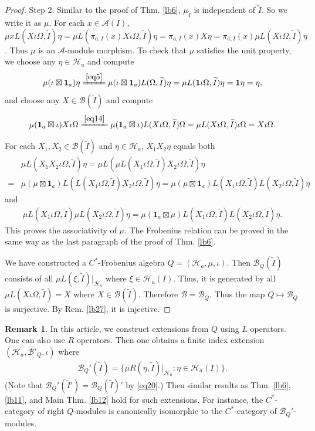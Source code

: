 \documentclass[11pt,b5paper,notitlepage]{article}
\theoremstyle{definition}
\newtheorem{rem}[df]{Remark}
\theoremstyle{plain}
\newcommand{\mc}{\mathcal}
\newcommand{\wtd}{\widetilde}
\newcommand{\id}{\mathbf{1}}
\numberwithin{equation}{section}
\begin{document}
\begin{proof}
Step 2. Similar to the proof of Thm. \ref{lb6}, $\mu_{\wtd I}$ is independent of $\wtd I$. So we write it as $\mu$. For each $x\in\mc A(I)$, $\mu xL(X\iota\Omega,\wtd I)\eta=\mu L(\pi_{a,I}(x) X\iota\Omega,\wtd I)\eta=\pi_{a,I}(x) X\eta=\pi_{a,I}(x)\mu L(X\iota\Omega,\wtd I)\eta$. Thus $\mu$ is an $\mc A$-module morphism. To check that $\mu$ satisfies the unit property, we choose any $\eta\in\mc H_a$ and compute
\begin{align*}
\mu(\iota\boxtimes\id_a)\eta\xlongequal{\eqref{eq5}}\mu(\iota\boxtimes\id_a)L(\Omega,\wtd I)\eta=\mu L(\id \iota\Omega,\wtd I)\eta=\id\eta=\eta,	
\end{align*}
and choose any $X\in\mc B(\wtd I)$ and compute
\begin{align*}
\mu (\id_a\boxtimes\iota)X\iota\Omega\xlongequal{\eqref{eq14}}\mu (\id_a\boxtimes\iota)L(X\iota\Omega,\wtd I)\Omega=\mu L(X\iota\Omega,\wtd I)\iota\Omega=X\iota\Omega.
\end{align*}

For each $X_1,X_2\in\mc B(\wtd I)$ and $\eta\in\mc H_a$, $X_1X_2\eta$ equals both
\begin{align*}
&\mu L(X_1X_2\iota\Omega,\wtd I)\eta=\mu L(\mu L(X_1\iota\Omega,\wtd I)X_2\iota\Omega,\wtd I)\eta\\
=&\mu(\mu\boxtimes\id_a) L(L(X_1\iota\Omega,\wtd I)X_2\iota\Omega,\wtd I)\eta=\mu(\mu\boxtimes\id_a) L(X_1\iota\Omega,\wtd I)L(X_2\iota\Omega,\wtd I)\eta	
\end{align*}
and
\begin{align*}
\mu L(X_1\iota\Omega,\wtd I)\mu L(X_2\iota\Omega,\wtd I)\eta	=\mu(\id_a\boxtimes\mu) L(X_1\iota\Omega,\wtd I)L(X_2\iota\Omega,\wtd I)\eta.
\end{align*}
This proves the associativity of $\mu$. The Frobenius relation can be proved in the same way as the last paragraph of the proof of Thm. \ref{lb6}. 

We have constructed a $C^*$-Frobenius algebra $Q=(\mc H_a,\mu,\iota)$. Then $\mc B_Q(\wtd I)$ consists of all $\mu L(\xi,\wtd I)|_{\mc H_a}$ where $\xi\in\mc H_a(I)$. Thus, it is generated by all $\mu L(X\iota\Omega,\wtd I)=X$ where $X\in\mc B(\wtd I)$. Therefore $\mc B=\mc B_Q$. Thus the map $Q\mapsto\mc B_Q$ is surjective. By Rem. \ref{lb27}, it is injective.
\end{proof}




\begin{rem}\label{lb14}
In this article, we construct extensions from $Q$ using $L$ operators. One can also use $R$ operators. Then one obtains a finite index extension $(\mc H_a,\mc B'_Q,\iota)$ where
\begin{align}
\mc B_Q'(\wtd I)=	\{\mu R(\eta,\wtd I)|_{\mc H_a}:\eta\in\mc H_a(I)\}.
\end{align}
(Note that $\mc B_Q'(\wtd I')=\mc B_Q(\wtd I)'$ by \eqref{eq20}.) Then similar results as Thm. \ref{lb6}, \ref{lb11}, and Main Thm.  \ref{lb12} hold for such extensions. For instance, the $C^*$-category of right $Q$-modules is canonically isomorphic to the $C^*$-category of $\mc B_Q'$-modules.
\end{rem}
\end{document}
